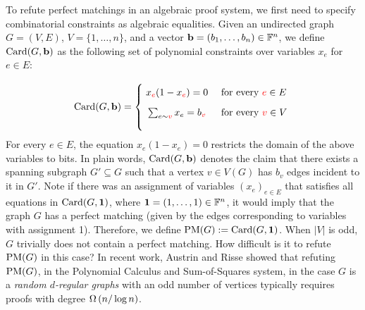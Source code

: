 \documentclass[11pt]{article}
\begin{document}
To refute perfect matchings in an algebraic proof system, we first need to specify combinatorial constraints as algebraic equalities. Given an undirected graph $G=(V,E)$, $V = \{1, \ldots, n\}$, and a vector $\mathbf{b} = (b_1, \ldots, b_{n}) \in \mathbb{F}^{n}$,
we define $\text{Card}(G, \mathbf{b})$ as the following set of polynomial constraints over variables $x_e$ for $e \in E$:

\[
        \Card{G, \vec{b}}=
        \Bigger[10]\{\begin{array}{@{}cl}
                x_{\highlight{e}}(1 - x_{\highlight{e}}) = 0 & \text{ for every $\highlight{e} \in E$}\\[3mm]
                \sum_{e \sim \highlight{v}} x_e = b_{\highlight{v}} & \text{ for every $\highlight{v} \in V$} \\[3mm]
        \end{array}
\]
For every $e \in E$, the equation $x_e(1 - x_e) = 0$ restricts the domain of the above variables to bits.
In plain words, $\text{Card}(G, \mathbf{b})$ denotes the claim that there exists a spanning subgraph $G' \subseteq G$ such that a vertex $v \in V(G)$ has $b_v$ edges incident to it in $G'$.
Note if there was an assignment of variables $(x_e)_{e \in E}$ that satisfies all equations in $\text{Card}(G, \mathbf{1})$, where $\mathbf{1} = (1, \ldots, 1) \in \mathbb{F}^{n}$, it would imply that the graph $G$ has a perfect matching (given by the edges corresponding to variables with assignment 1).
Therefore, we define $\text{PM}(G) := \text{Card}(G, \mathbf{1})$.
When $|V|$ is odd, $G$ trivially does not contain a perfect matching. How difficult is it to refute $\text{PM}(G)$ in this case? In recent work, Austrin and Risse \cite{Austrin_2022} showed that refuting $\text{PM}(G)$, in the Polynomial Calculus  and Sum-of-Squares system, in the case $G$ is a \emph{random $d$-regular graphs} with an odd number of vertices typically requires proofs with degree $\Omega\left(n/\log n\right)$.
\end{document}
